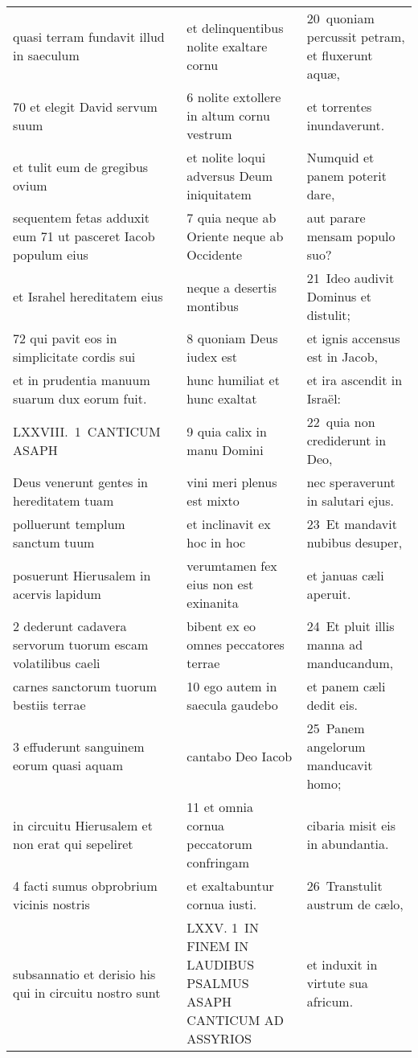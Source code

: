 \documentclass{article}
\begin{document}
\begin{longtable}{@{}p{}p{}p{}@{}}
quasi terram fundavit illud in saeculum	&	et delinquentibus nolite exaltare cornu	&	20 quoniam percussit petram, et fluxerunt aquæ,	\\
70 et elegit David servum suum	&	6 nolite extollere in altum cornu vestrum	&	et torrentes inundaverunt.	\\
et tulit eum de gregibus ovium	&	et nolite loqui adversus Deum iniquitatem	&	Numquid et panem poterit dare,	\\
sequentem fetas adduxit eum 71 ut pasceret Iacob populum eius	&	7 quia neque ab Oriente neque ab Occidente	&	aut parare mensam populo suo?	\\
et Israhel hereditatem eius	&	neque a desertis montibus	&	21 Ideo audivit Dominus et distulit;	\\
72 qui pavit eos in simplicitate cordis sui	&	8 quoniam Deus iudex est	&	et ignis accensus est in Jacob,	\\
et in prudentia manuum suarum dux eorum fuit.	&	hunc humiliat et hunc exaltat	&	et ira ascendit in Israël:	\\
LXXVIII. 1 CANTICUM ASAPH	&	9 quia calix in manu Domini	&	22 quia non crediderunt in Deo,	\\
Deus venerunt gentes in hereditatem tuam	&	vini meri plenus est mixto	&	nec speraverunt in salutari ejus.	\\
polluerunt templum sanctum tuum	&	et inclinavit ex hoc in hoc	&	23 Et mandavit nubibus desuper,	\\
posuerunt Hierusalem in acervis lapidum	&	verumtamen fex eius non est exinanita	&	et januas cæli aperuit.	\\
2 dederunt cadavera servorum tuorum escam volatilibus caeli	&	bibent ex eo omnes peccatores terrae	&	24 Et pluit illis manna ad manducandum,	\\
carnes sanctorum tuorum bestiis terrae	&	10 ego autem in saecula gaudebo	&	et panem cæli dedit eis.	\\
3 effuderunt sanguinem eorum quasi aquam	&	cantabo Deo Iacob	&	25 Panem angelorum manducavit homo;	\\
in circuitu Hierusalem et non erat qui sepeliret	&	11 et omnia cornua peccatorum confringam	&	cibaria misit eis in abundantia.	\\
4 facti sumus obprobrium vicinis nostris	&	et exaltabuntur cornua iusti.	&	26 Transtulit austrum de cælo,	\\
subsannatio et derisio his qui in circuitu nostro sunt	&	LXXV. 1 IN FINEM IN LAUDIBUS PSALMUS ASAPH CANTICUM AD ASSYRIOS	&	et induxit in virtute sua africum.	\\

\end{longtable}
\end{document}
